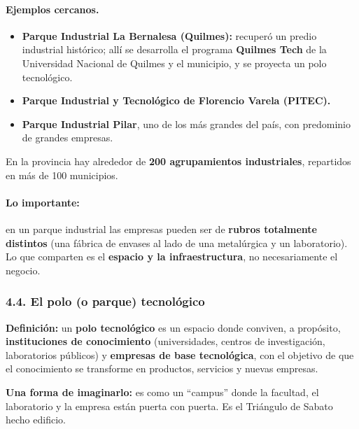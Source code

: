 \paragraph*{Ejemplos cercanos.}
\begin{itemize}
  \item \textbf{Parque Industrial La Bernalesa (Quilmes):} recuperó un predio industrial
        histórico; allí se desarrolla el programa \textbf{Quilmes Tech} de la Universidad
        Nacional de Quilmes y el municipio, y se proyecta un polo tecnológico.
  \item \textbf{Parque Industrial y Tecnológico de Florencio Varela (PITEC).}
  \item \textbf{Parque Industrial Pilar}, uno de los más grandes del país, con predominio de
        grandes empresas.
\end{itemize}
En la provincia hay alrededor de \textbf{200 agrupamientos industriales}, repartidos en más de
100 municipios.

\paragraph*{Lo importante:} en un parque industrial las empresas pueden ser de
\textbf{rubros totalmente distintos} (una fábrica de envases al lado de una metalúrgica y un
laboratorio). Lo que comparten es el \textbf{espacio y la infraestructura}, no
necesariamente el negocio.

\subsubsection*{4.4. El polo (o parque) tecnológico}

\begin{recuadro}
\textbf{Definición:} un \textbf{polo tecnológico} es un espacio donde conviven, a propósito,
\textbf{instituciones de conocimiento} (universidades, centros de investigación, laboratorios
públicos) y \textbf{empresas de base tecnológica}, con el objetivo de que el conocimiento se
transforme en productos, servicios y nuevas empresas.
\end{recuadro}

\textbf{Una forma de imaginarlo:} es como un ``campus'' donde la facultad, el laboratorio y la
empresa están puerta con puerta. Es el Triángulo de Sabato hecho edificio.

